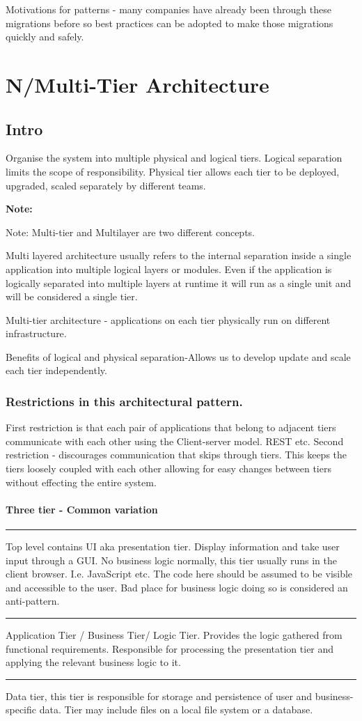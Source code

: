 \documentclass[a4paper, 11pt]{book}
\newenvironment{note}{
    \begin{siderule}
        \textbf{Note: }
        }{
    \end{siderule}}
\begin{document}
    Motivations for patterns - many companies have already been through these migrations before so best practices can be adopted to make those migrations quickly and safely.


    \section{N/Multi-Tier Architecture}

    \subsection{Intro}
    Organise the system into multiple physical and logical tiers.
    Logical separation limits the scope of responsibility.
    Physical tier allows each tier to be deployed, upgraded, scaled separately by different teams.

    \begin{note}
        Note: Multi-tier and Multilayer are two different concepts.
    \end{note}
    Multi layered architecture usually refers to the internal separation inside a single application into multiple logical layers or modules.
    Even if the application is logically separated into multiple layers at runtime it will run as a single unit and will be considered a single tier.

    Multi-tier architecture - applications on each tier physically run on different infrastructure.

    Benefits of logical and physical separation-Allows us to develop update and scale each tier independently.

    \subsubsection{Restrictions in this architectural pattern.}
    First restriction is that each pair of applications that belong to adjacent tiers communicate with each other using the Client-server model.
    REST etc.
    Second restriction - discourages communication that skips through tiers.
    This keeps the tiers loosely coupled with each other allowing for easy changes between tiers without effecting the entire system.

    \paragraph{Three tier - Common variation}
    \hrule
    Top level contains UI aka presentation tier.
    Display information and take user input through a GUI\@.
    No business logic normally, this tier usually runs in the client browser.
    I.e. JavaScript etc.
    The code here should be assumed to be visible and accessible to the user.
    Bad place for business logic doing so is considered an anti-pattern.
    \hrule
    Application Tier / Business Tier/ Logic Tier.
    Provides the logic gathered from functional requirements.
    Responsible for processing the presentation tier and applying the relevant business logic to it.
    \hrule
    Data tier, this tier is responsible for storage and persistence of user and business-specific data.
    Tier may include files on a local file system or a database.
\end{document}
